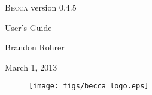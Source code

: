 \documentclass[12pt,oneside]{book}
\begin{document}
\begin{centering}
\thispagestyle{empty}
\vspace{7cm}
{\huge \textsc{Becca} version 0.4.5
\vspace{1cm}

User's Guide}
\vspace{4cm}

{\Large
Brandon Rohrer
\vspace{1cm}

March 1, 2013}

\vspace{4cm}

\begin{figure}[h]
\centering
\texttt{[image: figs/becca\_logo.eps]}
\end{figure}

\newpage
\end{centering}

\tableofcontents
\newpage

\addtolength{\parskip}{\baselineskip}

\setcounter{tocdepth}{0}











\appendix













%













\end{document}
